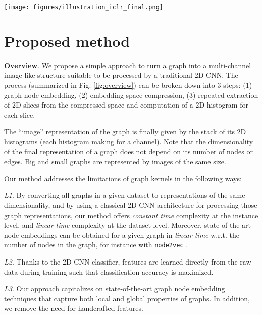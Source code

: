 \documentclass[runningheads]{llncs}
\begin{document}
\begin{figure*}[h]
  \centering
    \texttt{[image: figures/illustration\_iclr\_final.png]}
\captionsetup{justification=justified,size=small}
    \caption{Our 3-step approach represents graphs as ``images'' suitable for vanilla 2D CNNs. Continuous node attribute vectors can be passed as extra channels. Steps 1 \& 2: graph node embeddings and compression with PCA. Step 3: computation and stacking of the 2D histograms.}
\label{fig:overview}
\end{figure*}

\vspace{-1cm}

\section{Proposed method}
\noindent \textbf{Overview}.
We propose a simple approach to turn a graph into a multi-channel image-like structure suitable to be processed by a traditional 2D CNN. The process (summarized in Fig. \ref{fig:overview}) can be broken down into 3 steps:
(1) graph node embedding,
(2) embedding space compression,
(3) repeated extraction of 2D slices from the compressed space and computation of a 2D histogram for each slice.

The ``image'' representation of the graph is finally given by the stack of its 2D histograms (each histogram making for a channel). Note that the dimensionality of the final representation of a graph does not depend on its number of nodes or edges. Big and small graphs are represented by images of the same size.

Our method addresses the limitations of graph kernels in the following ways: 

\textit{L1}. By converting all graphs in a given dataset to representations of the same dimensionality, and by using a classical 2D CNN architecture for processing those graph representations, our method offers \textit{constant time} complexity at the instance level, and \textit{linear time} complexity at the dataset level. Moreover, state-of-the-art node embeddings can be obtained for a given graph in \textit{linear time} w.r.t. the number of nodes in the graph, for instance with \texttt{node2vec} \cite{grover2016node2vec}.

\textit{L2}. Thanks to the 2D CNN classifier, features are learned directly from the raw data during training such that classification accuracy is maximized.

\textit{L3}. Our approach capitalizes on state-of-the-art graph node embedding techniques that capture both local and global properties of graphs. In addition, we remove the need for handcrafted features.
\end{document}
